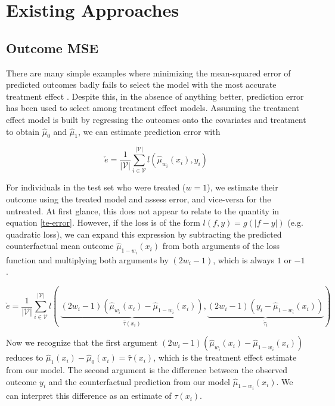 \section{Existing Approaches}
\label{approaches}

\subsection{Outcome MSE}

There are many simple examples where minimizing the mean-squared error of predicted outcomes badly fails to select the model with the most accurate treatment effect \cite{Rolling:2013kz}. Despite this, in the absence of anything better, prediction error has been used to select among treatment effect models. Assuming the treatment effect model is built by regressing the outcomes onto the covariates and treatment to obtain $\hat\mu_0$ and $\hat\mu_1$, we can estimate prediction error with

\begin{equation}
	\check e = \frac{1}{|\mathcal{V}|} \sum_{i \in \mathcal{V}}^{|\mathcal{V}|}  
	l(\hat \mu_{w_i} (x_i), y_i) 
\label{pred-error}
\end{equation}
 
For individuals in the test set who were treated ($w=1$), we estimate their outcome using the treated model and assess error, and vice-versa for the untreated. At first glance, this does not appear to relate to the quantity in equation \ref{te-error}. However, if the loss is of the form $l(f,y) = g(|f-y|)$ (e.g. quadratic loss), we can expand this expression by subtracting the predicted counterfactual mean outcome $\hat\mu_{1-w_i}(x_i)$ from both arguments of the loss function and multiplying both arguments by $(2w_i -1)$, which is always $1$ or $-1$.

\begin{equation}
	\check e = \frac{1}{|\mathcal{V}|} \sum_{i \in \mathcal{V}}^{|\mathcal{V}|}  
	l( \ 
	\underbrace{(2w_i -1) (\hat\mu_{w_i} (x_i) - \hat\mu_{1-w_i}(x_i))}_{\hat\tau(x_i)}, 
	\underbrace{(2w_i -1) (y_i - \hat\mu_{1-w_i}(x_i))}_{\check\tau_i}
	) 
\label{pred-error-expansion}
\end{equation}

Now we recognize that the first argument $(2w_i -1) (\hat\mu_{w_i} (x_i) - \hat\mu_{1-w_i}(x_i))$ reduces to $\hat\mu_1 (x_i) - \hat\mu_0(x_i) = \hat\tau(x_i)$, which is the treatment effect estimate from our model. The second argument is the difference between the observed outcome $y_i$ and the counterfactual prediction from our model $\hat\mu_{1-w_i}(x_i)$. We can interpret this difference as an estimate of $\tau(x_i)$. 

